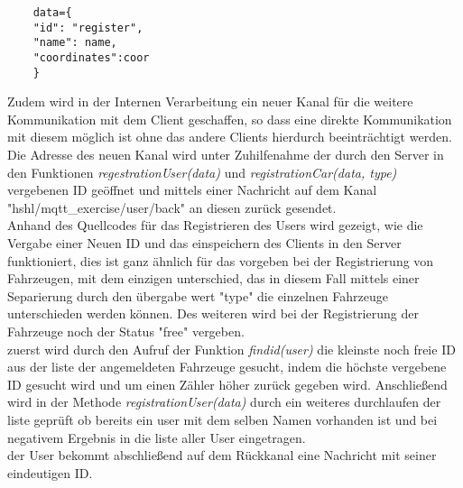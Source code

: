 \documentclass[conference]{IEEEtran}
\begin{document}
\begin{lstlisting}
    data={
    "id": "register",
    "name": name,
    "coordinates":coor
    }	
\end{lstlisting}
Zudem wird in der Internen Verarbeitung ein neuer Kanal für die weitere Kommunikation mit dem Client geschaffen, so dass eine direkte Kommunikation mit diesem möglich ist ohne das andere Clients hierdurch beeinträchtigt werden. Die Adresse des neuen Kanal wird unter Zuhilfenahme  der durch den Server in den Funktionen \textit{regestrationUser(data)} und \textit{registrationCar(data, type)} vergebenen ID geöffnet und mittels einer Nachricht auf dem Kanal \textsf{"hshl/mqtt\_exercise/user/back"} an diesen zurück gesendet. \\
Anhand des Quellcodes für das Registrieren des Users wird gezeigt, wie die Vergabe einer Neuen ID und das einspeichern des Clients in den Server funktioniert, dies ist ganz ähnlich für das vorgeben bei der Registrierung von Fahrzeugen, mit dem einzigen unterschied, das in diesem Fall mittels einer Separierung durch den übergabe wert "type" die einzelnen Fahrzeuge unterschieden werden können. Des weiteren wird bei der Registrierung der Fahrzeuge noch der Status "free" vergeben.\\
zuerst wird durch den Aufruf der Funktion \textit{findid(user)} die kleinste noch freie ID aus der liste der angemeldeten Fahrzeuge gesucht, indem die höchste vergebene ID gesucht wird und um einen Zähler höher zurück gegeben wird. Anschließend wird in der Methode \textit{registrationUser(data)} durch ein weiteres durchlaufen der liste geprüft ob bereits ein user mit dem selben Namen vorhanden ist und bei negativem Ergebnis in  die liste aller User eingetragen.\\ der User bekommt abschließend auf dem Rückkanal eine Nachricht mit seiner eindeutigen ID. 
\end{document}
